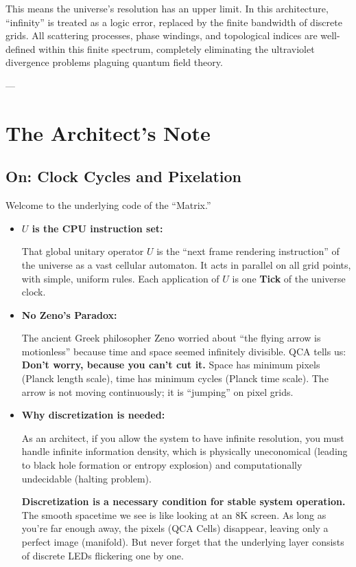 \documentclass[11pt,a4paper,twoside]{book}
\begin{document}
This means the universe's resolution has an upper limit. In this architecture, ``infinity'' is treated as a logic error, replaced by the finite bandwidth of discrete grids. All scattering processes, phase windings, and topological indices are well-defined within this finite spectrum, completely eliminating the ultraviolet divergence problems plaguing quantum field theory.

---

\section{The Architect's Note}

\subsection{On: Clock Cycles and Pixelation}

Welcome to the underlying code of the ``Matrix.''

\begin{itemize}
\item \textbf{$U$ is the CPU instruction set:}

    That global unitary operator \textbf{$U$} is the ``next frame rendering instruction'' of the universe as a vast cellular automaton. It acts in parallel on all grid points, with simple, uniform rules. Each application of \textbf{$U$} is one \textbf{Tick} of the universe clock.

\item \textbf{No Zeno's Paradox:}

    The ancient Greek philosopher Zeno worried about ``the flying arrow is motionless'' because time and space seemed infinitely divisible. QCA tells us: \textbf{Don't worry, because you can't cut it.} Space has minimum pixels (Planck length scale), time has minimum cycles (Planck time scale). The arrow is not moving continuously; it is ``jumping'' on pixel grids.

\item \textbf{Why discretization is needed:}

    As an architect, if you allow the system to have infinite resolution, you must handle infinite information density, which is physically uneconomical (leading to black hole formation or entropy explosion) and computationally undecidable (halting problem).

    \textbf{Discretization is a necessary condition for stable system operation.} The smooth spacetime we see is like looking at an 8K screen. As long as you're far enough away, the pixels (QCA Cells) disappear, leaving only a perfect image (manifold). But never forget that the underlying layer consists of discrete LEDs flickering one by one.
\end{itemize}
\end{document}
